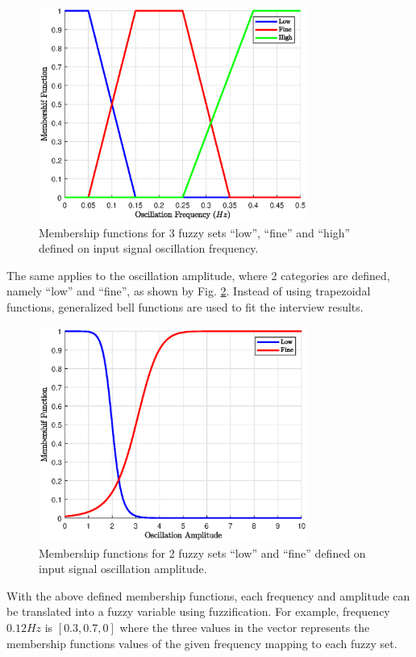 \begin{figure}
	\centering
	\includegraphics[width=250pt]{chapters/ch-fuzzy-control-system/figures/exp_vibration_detection_mf_freq.eps}
	\caption{Membership functions for 3 fuzzy sets ``low'', ``fine'' and ``high'' defined on input signal oscillation frequency.}
	\label{ch:fcs:fig:exp_vibration_detection_mf_freq}
\end{figure}

The same applies to the oscillation amplitude, where 2 categories are defined, namely ``low'' and ``fine'', as shown by Fig. \ref{ch:fcs:fig:exp_vibration_detection_mf_amp}. Instead of using trapezoidal functions, generalized bell functions are used to fit the interview results.

\begin{figure}
	\centering
	\includegraphics[width=250pt]{chapters/ch-fuzzy-control-system/figures/exp_vibration_detection_mf_amp.eps}
	\caption{Membership functions for 2 fuzzy sets ``low'' and ``fine'' defined on input signal oscillation amplitude.}
	\label{ch:fcs:fig:exp_vibration_detection_mf_amp}
\end{figure}

With the above defined membership functions, each frequency and amplitude can be translated into a fuzzy variable using fuzzification. For example, frequency $0.12Hz$ is $[0.3, 0.7, 0]$ where the three values in the vector represents the membership functions values of the given frequency mapping to each fuzzy set.

